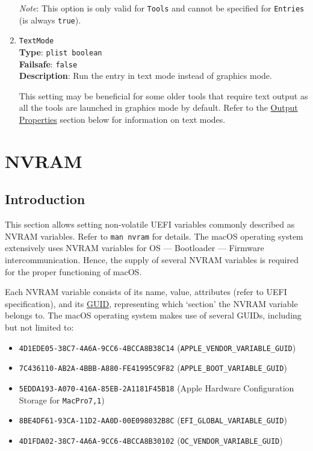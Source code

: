 \documentclass[]{article}
\makeatletter
\providecommand{\tightlist}{%
  \setlength{\itemsep}{0pt}\setlength{\parskip}{0pt}}
\renewcommand{\label}[1]{%
\zref@wrapper@immediate{\oldlabel{#1}}}  %
\makeatother
\begin{document}
\begin{enumerate}
  \emph{Note}: This option is only valid for \texttt{Tools} and cannot be
  specified for \texttt{Entries} (is always \texttt{true}).

\item
  \texttt{TextMode}\\
  \textbf{Type}: \texttt{plist\ boolean}\\
  \textbf{Failsafe}: \texttt{false}\\
  \textbf{Description}: Run the entry in text mode instead of graphics mode.

  This setting may be beneficial for some older tools that require text output
  as all the tools are launched in graphics mode by default. Refer to the
  \hyperref[uefioutputprops]{Output Properties} section below for information on text modes.

\end{enumerate}

\section{NVRAM}\label{nvram}

\subsection{Introduction}\label{nvramintro}

This section allows setting non-volatile UEFI variables commonly described
as NVRAM variables. Refer to \texttt{man\ nvram} for details.
The macOS operating system extensively uses NVRAM variables for OS --- Bootloader
--- Firmware intercommunication. Hence, the supply of several NVRAM variables
is required for the proper functioning of macOS.

Each NVRAM variable consists of its name, value, attributes (refer to
UEFI specification), and its
\href{https://en.wikipedia.org/wiki/Universally_unique_identifier}{GUID},
representing which `section' the NVRAM variable belongs to. The macOS
operating system makes use of several GUIDs, including but not limited to:

\begin{itemize}
\tightlist
\item
  \texttt{4D1EDE05-38C7-4A6A-9CC6-4BCCA8B38C14}
  (\texttt{APPLE\_VENDOR\_VARIABLE\_GUID})
\item
  \texttt{7C436110-AB2A-4BBB-A880-FE41995C9F82}
  (\texttt{APPLE\_BOOT\_VARIABLE\_GUID})
\item
  \texttt{5EDDA193-A070-416A-85EB-2A1181F45B18}
  (Apple Hardware Configuration Storage for \texttt{MacPro7,1})
\item
  \texttt{8BE4DF61-93CA-11D2-AA0D-00E098032B8C}
  (\texttt{EFI\_GLOBAL\_VARIABLE\_GUID})
\item
  \texttt{4D1FDA02-38C7-4A6A-9CC6-4BCCA8B30102}
  (\texttt{OC\_VENDOR\_VARIABLE\_GUID})
\end{itemize}
\end{document}
